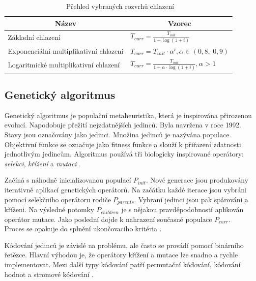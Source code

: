 \def\arraystretch{1.5}
\begin{table}[!htbp]
\centering
\caption[Přehled vybraných rozvrhů chlazení]{~Přehled vybraných rozvrhů chlazení}\label{tab:cooling:schedules}
{%
\begin{tabular}{|l|l|}
\hline
\multicolumn{1}{|c|}{\textbf{Název}} & \multicolumn{1}{c|}{\textbf{Vzorec}}                 \\ \hline
Základní chlazení                    & \small\(\displaystyle T_{curr} = \frac{T_{init}}{1+\log(1+i)}\)           \\ \hline
Exponenciální multiplikativní chlazení & \small\(\displaystyle T_{curr} = T_{init} \cdot \alpha^i, \alpha \in \left(0,8,\;0,9\right)\) \\ \hline
Logaritmické multiplikativní chlazení  & \small\(\displaystyle T_{curr} = \frac{T_{init}}{1+\alpha \cdot \log(1+i)}, \alpha>1\)        \\ \hline
\end{tabular}%
}
\end{table}
\def\arraystretch{1}

\subsection{Genetický algoritmus}
Genetický algoritmus je populační metaheuristika, která je inspirována přirozenou evolucí.
Napodobuje přežití nejzdatnějších jedinců.
Byla navržena v roce 1992.
Stavy jsou označovány jako jedinci.
Množina jedinců je nazývána populace.
Objektivní funkce se označuje jako fitness funkce a slouží k přiřazení zdatnosti jednotlivým jedincům.
Algoritmus používá tři biologicky inspirované operátory: \textit{selekci}, \textit{křížení} a \textit{mutaci} \cite{katoch}.

Začíná s náhodně inicializovanou populací $P_{init}$.
Nové generace jsou produkovány iterativně aplikací genetických operátorů.
Na začátku každé iterace jsou vybráni pomocí selekčního operátoru rodiče $P_{parents}$.
Vybraní jedinci jsou pak spárováni a kříženi.
Na výsledné potomky $P_{children}$ je s nějakou pravděpodobností aplikován operátor mutace.
Jako poslední dojde k nahrazení současné populace $P_{curr}$.
Proces se opakuje do splnění ukončovacího kritéria \cite{katoch}.

Kódování jedinců je závislé na problému, ale často se provádí pomocí binárního řetězce.
Hlavní výhodou je, že operátory křížení a mutace lze snadno a rychle implementovat.
Mezi další typy kódování patří permutační kódování, kódování hodnot a stromové kódování \cite{katoch}.

